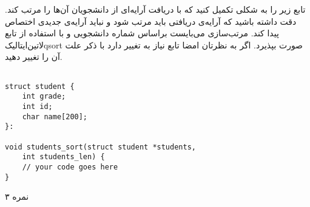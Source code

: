 
تابع زیر را به شکلی تکمیل کنید که با دریافت آرایه‌ای از دانشجویان آن‌ها را مرتب کند.
دقت داشته باشید که آرایه‌ی دریافتی باید مرتب شود و نباید آرایه‌ی جدیدی اختصاص پیدا کند.
مرتب‌سازی می‌بایست براساس شماره دانشجویی و با استفاده از تابع
‌لاتین{‌ایتالیک{qsort}}
صورت بپذیرد.
اگر به نظرتان امضا تابع نیاز به تغییر دارد با ذکر علت آن را تغییر دهید.

\begin{latin}
\begin{verbatim}

struct student {
    int grade;
    int id;
    char name[200];
}:

void students_sort(struct student *students,
    int students_len) {
    // your code goes here
}
\end{verbatim}
\end{latin}

۳ نمره
